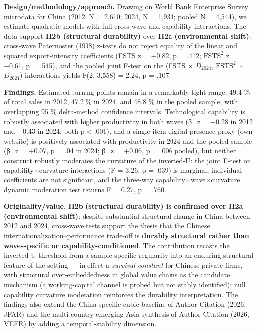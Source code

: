 \documentclass[12pt,a4paper]{article}
\begin{document}
\textbf{Design/methodology/approach.} Drawing on World Bank Enterprise
Survey microdata for China (2012, N = 2,610; 2024, N = 1,934; pooled N =
4,544), we estimate quadratic models with full cross-wave and capability
interactions. The data support \textbf{H2b (structural durability)} over
\textbf{H2a (environmental shift)}: cross‑wave Paternoster (1998)
z‑tests do not reject equality of the linear and squared
export‑intensity coefficients (FSTS z = +0.82, p = .412;
\(\mathrm{FSTS}^2\) z = −0.61, p = .545), and the pooled joint F-test on
the (FSTS × \(D_{2024}\), \(\mathrm{FSTS}^2\) × \(D_{2024}\))
interactions yields F(2, 3,558) = 2.24, p = .107.

\textbf{Findings.} Estimated turning points remain in a remarkably tight
range, 49.4 \% of total sales in 2012, 47.2 \% in 2024, and 48.8 \% in
the pooled sample, with overlapping 95 \% delta‑method confidence
intervals. Technological capability is robustly associated with higher
productivity in both waves (β\_z = +0.28 in 2012 and +0.43 in 2024; both
p \textless{} .001), and a single‑item digital‑presence proxy (own
website) is positively associated with productivity in 2024 and the
pooled sample (β\_z = +0.07, p = .04 in 2024; β\_z = +0.06, p = .006
pooled), but neither construct robustly moderates the curvature of the
inverted-U: the joint F‑test on capability×curvature interactions (F =
3.26, p = .039) is marginal, individual coefficients are not
significant, and the three‑way capability×wave×curvature dynamic
moderation test returns F = 0.27, p = .760.

\textbf{Originality/value.} \textbf{H2b (structural durability) is
confirmed over H2a (environmental shift)}: despite substantial
structural change in China between 2012 and 2024, cross-wave tests
support the thesis that the Chinese internationalization--performance
trade-off is \textbf{durably structural rather than wave-specific or
capability-conditioned}. The contribution recasts the inverted-U
threshold from a sample-specific regularity into an enduring structural
feature of the setting --- in effect a \emph{survival constant} for
Chinese private firms, with structural over-embeddedness in global value
chains as the candidate mechanism (a working-capital channel is probed
but not stably identified); null capability curvature moderation
reinforces the durability interpretation. The findings also extend the
China-specific cubic baseline of Author Citation (2026, JFAR) and the
multi-country emerging-Asia synthesis of Author Citation (2026, VEFR) by
adding a temporal-stability dimension.
\end{document}
